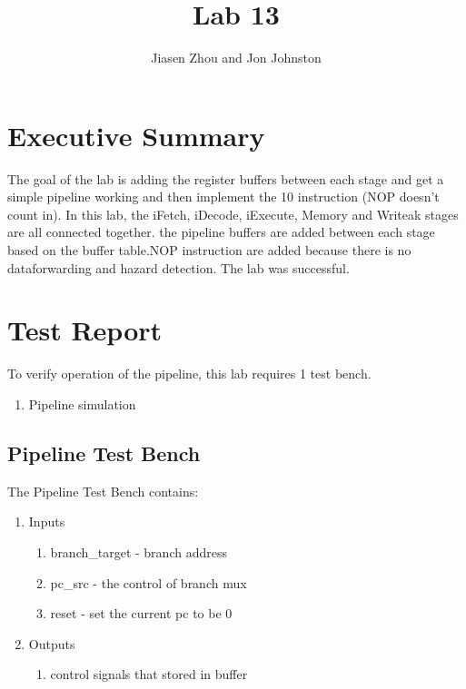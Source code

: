 \documentclass{article}
\author{Jiasen Zhou and Jon Johnston}
\title{Lab 13}
\begin{document}
\maketitle

\section{Executive Summary}
The goal of the lab is adding the register buffers between each stage and get a simple pipeline working and then implement the 10 instruction (NOP doesn't count in). In this lab, the iFetch, iDecode, iExecute, Memory and Writeak stages are all connected together. the pipeline buffers are added between each stage based on the buffer table.NOP instruction are added because there is no dataforwarding and hazard detection. The lab was successful.


\section{Test Report}
To verify operation of the pipeline, this lab requires 1 test bench.
\begin{enumerate}
	\item Pipeline simulation
\end{enumerate}
\subsection{Pipeline Test Bench}
The Pipeline Test Bench contains:
\begin{enumerate}
	\item Inputs
	\begin{enumerate}
		\item branch\_target - branch address
		\item pc\_src - the control of branch mux
		\item reset - set the current pc to be 0
		
	\end{enumerate}	
	\item Outputs
	\begin{enumerate}	
		\item  control signals that stored in buffer 
	\end{enumerate}	
\end{enumerate} 
\pagebreak
\end{document}
